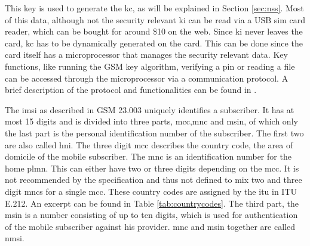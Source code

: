 This key is used to generate the \gls{kc}, as will be explained in Section \ref{sec:nss}.
Most of this data, although not the security relevant \gls{ki} can be read via a USB \gls{sim} card reader, which can be bought for around \$10 on the web.
Since \gls{ki} never leaves the card, \gls{kc} has to be dynamically generated on the card.
This can be done since the card itself has a microprocessor that manages the security relevant data.
Key functions, like running the GSM key algorithm, verifying a \gls{pin} or reading a file can be accessed through the microprocessor via a communication protocol.
A brief description of the protocol and functionalities can be found in \cite{kommsys2006}.

The \gls{imsi} as described in GSM 23.003\cite{GSM23003} uniquely identifies a subscriber.
It has at most 15 digits and is divided into three parts, \gls{mcc},\gls{mnc} and \gls{msin}, of which only the last part is the personal identification number of the subscriber.
The first two are also called \gls{hni}.
The three digit \gls{mcc} describes the country code, the area of domicile of the mobile subscriber.
The \gls{mnc} is an identification number for the home \gls{plmn}.
This can either have two or three digits depending on the \gls{mcc}.
It is not recommended by the specification and thus not defined to mix two and three digit \gls{mnc}s for a single \gls{mcc}.
These country codes are assigned by the \gls{itu} in ITU E.212\cite{ITU212}.
An excerpt can be found in Table \ref{tab:countrycodes}.
The third part, the \gls{msin} is a number consisting of up to ten digits, which is used for authentication of the mobile subscriber against his provider.
\gls{mnc} and \gls{msin} together are called \gls{nmsi}.

